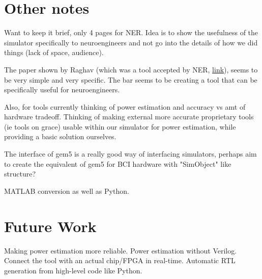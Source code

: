 \documentclass[twocolumn]{article}
\begin{document}
\section{Other notes}

Want to keep it brief, only 4 pages for NER. Idea is to show the usefulness of the simulator specifically to neuroengineers and not go into the details of how we did things (lack of space, audience). 

The paper shown by Raghav (which was a tool accepted by NER, \href{https://drive.google.com/file/d/1-f7rhJeyTUKX2FIG0FNM0RvG3iNqYFV8/view}{link}), seems to be very simple and very specific. The bar seems to be creating a tool that can be specifically useful for neuroengineers.

Also, for tools currently thinking of power estimation and accuracy vs amt of hardware tradeoff. Thinking of making external more accurate proprietary tools (ie tools on grace) usable within our simulator for power estimation, while providing a basic solution ourselves.

The interface of gem5 is a really good way of interfacing simulators, perhaps aim to create the equivalent of gem5 for BCI hardware with "SimObject" like structure?

MATLAB conversion as well as Python.

\section{Future Work}

Making power estimation more reliable. Power estimation without Verilog. Connect the tool with an actual chip/FPGA in real-time. Automatic RTL generation from high-level code like Python.

\printbibliography
\end{document}
